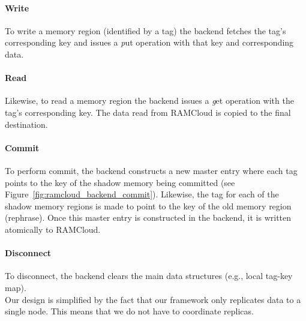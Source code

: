 \paragraph{\bf Write} To write a memory region (identified by a tag) the backend fetches the tag's corresponding key and issues a {\emph put } operation with that key and corresponding data.
\paragraph{\bf Read} Likewise, to read a memory region the backend issues a {\emph get} operation with the tag's corresponding key. The data read from RAMCloud is copied to the final destination.
\paragraph{\bf Commit} To perform commit, the backend constructs a new master entry where each tag points to the key of the shadow memory being committed (see Figure~\ref{fig:ramcloud_backend_commit}). Likewise, the tag for each of the shadow
memory regions is made to point to the key of the old memory region (rephrase). Once this master entry is constructed in the backend, it is written atomically to RAMCloud.
\paragraph{\bf Disconnect} To disconnect, the backend clears the main data structures (e.g., local tag-key map).\\

Our design is simplified by the fact that our framework only replicates data to a single node. This means that we do not have to coordinate replicas.
